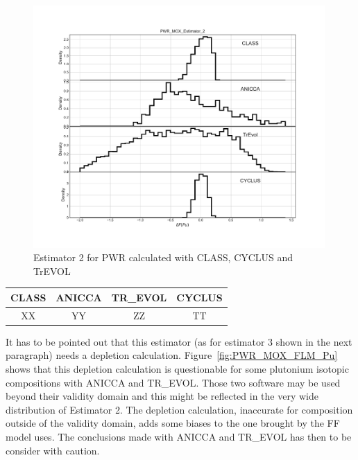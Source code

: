 \begin{figure}[h]
	\begin{center}
		\includegraphics[width = 0.99\textwidth]{../../Feature_1/RAW_DATA/FIG/PWR_MOX_Estimator_2.pdf}
		\caption{Estimator 2 for \gls{PWR} calculated with CLASS, CYCLUS and TrEVOL}
		\label{fig:Est2_PWR}
	\end{center}
\end{figure}

\begin{table}[h]
	\begin{center}
		\begin{tabular}{|c||c||c||c|}
			\hline 
				CLASS & ANICCA & TR\_EVOL & CYCLUS \\
			\hline
				XX & YY & ZZ & TT \\
		\end{tabular}
	\end{center}
	\label{table:Est2_PWR}
\end{table}

It has to be pointed out that this estimator (as for estimator 3 shown in the
next paragraph) needs a depletion calculation.  Figure~\ref{fig:PWR_MOX_FLM_Pu}
shows that this depletion calculation is questionable for some plutonium
isotopic compositions with ANICCA and TR\_EVOL.  Those two software may be used
beyond their validity domain and this might be reflected in the very wide
distribution of Estimator 2. The depletion calculation, inaccurate for
composition outside of the validity domain, adds some biases to the one brought
by the \gls{FF} model uses. The conclusions made with ANICCA and TR\_EVOL has
then to be consider with caution.

